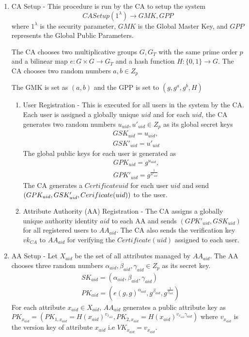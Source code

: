 \begin{enumerate}
	
	\item CA Setup - This procedure is run by the CA to setup the system $$ CASetup(1^{\lambda}) \longrightarrow GMK, GPP $$
	where $ 1^{\lambda} $ is the security parameter, $ GMK $ is the Global Master Key, and $ GPP $ represents the Global Public Parameters.
	
	The CA chooses two multiplicative groups $ G, G_{T} $ with the same prime order $ p $ and a bilinear map $ e \colon G \times G \rightarrow G_{T} $ and a hash function $ H \colon \{0, 1\} \rightarrow G. $ The CA chooses two random numbers $ a, b \in Z_{p} $
	
	The GMK is set as $ (a, b) $ and the GPP is set to $ (g, g^{a}, g^{b}, H) $
	
	\begin{enumerate}
		
		\item User Registration - This is executed for all users in the system by the CA. Each user is assigned a globally unique $ uid $ and for each $ uid $, the CA generates two random numbers $ u_{uid}, u'_{uid} \in Z_{p} $ as its global secret keys
		\begin{align*}
		&GSK_{uid} = u_{uid}, \\ &GSK'_{uid} = u'_{uid}
		\end{align*}
		The global public keys for each user is generated as 
		\begin{align*}
		&GPK_{uid} = g^{u_{uid}}, \\ &GPK'_{uid} = g^{\frac{1}{u'_{uid}}}
		\end{align*}
		The CA generates a $ Certificate{uid} $ for each user $ uid $ and send $ (GPK_{uid}, GSK'_{uid}, \\ Cerificate(uid)) $ to the user.
		
		\item Attribute Authority (AA) Registration - The CA assigns a globally unique authority identity $ aid $ to each AA and sends $ (GPK'_{uid}, GSK_{uid}) $ for all registered users to $ AA_{aid} $. The CA also sends the verification key $ vk_{CA} $ to $ AA_{aid} $ for verifying the $ Certificate(uid) $ assigned to each user.
		
	\end{enumerate}
	
	\item AA Setup - Let $ X_{aid} $ be the set of all attributes managed by $ AA_{aid} $. The AA chooses three random numbers $ \alpha_{aid}, \beta_{aid}, \gamma_{aid} \in Z_{p} $ as its secret key.
	\begin{align*}
	&SK_{aid} = (\alpha_{aid}, \beta_{aid}, \gamma_{aid}) \\
	&PK_{aid} = (e(g, g)^{\alpha_{aid}}, g^{\beta_{aid}}, g^{\frac{1}{\beta_{aid}}})
	\end{align*}
	For each attribute $ x_{aid} \in X_{aid} $, $ AA_{aid} $ generates a public attribute key as $ PK_{x_{aid}} = (PK_{1, x_{aid}} = H(x_{aid})^{v_{x_{aid}}}, PK_{2, x_{aid}} = H(x_{aid})^{v_{x_{aid}}\gamma_{aid}}) $ where $ v_{x_{aid}} $ is the version key of attribute $ x_{aid} $ i.e $ VK_{x_{aid}} = v_{x_{aid}} $.
	

\end{enumerate}
